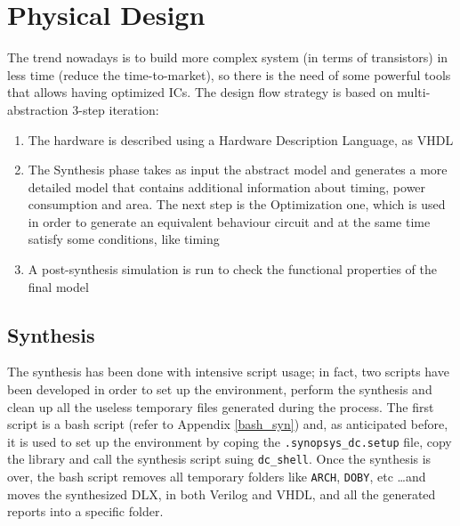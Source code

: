 \chapter{Physical Design}
The trend nowadays is to build more complex system (in terms of transistors) in less time (reduce the time-to-market), so there is the need of some powerful tools that allows having optimized ICs. The design flow strategy is based on multi-abstraction 3-step iteration:
\begin{enumerate}
    \item The hardware is described using a Hardware Description Language, as VHDL
    \item The Synthesis phase takes as input the abstract model and generates a more detailed model that contains additional information about timing, power consumption and area. The next step is the Optimization one, which is used in order to generate an equivalent behaviour circuit and at the same time satisfy some conditions, like timing
    \item A post-synthesis simulation is run to check the functional properties of the final model
\end{enumerate}
\section{Synthesis}
\label{sec:syn_opt}
The synthesis has been done with intensive script usage; in fact, two scripts have been developed in order to set up the environment, perform the synthesis and clean up all the useless temporary files generated during the process.\newline\newline
The first script is a bash script (refer to Appendix \ref{bash_syn}) and, as anticipated before, it is used to set up the environment by coping the \texttt{.synopsys\_dc.setup} file, copy the library and call the synthesis script suing \texttt{dc\_shell}.
Once the synthesis is over, the bash script removes all temporary folders like \texttt{ARCH}, \texttt{DOBY}, etc \dots and moves the synthesized DLX, in both Verilog and VHDL, and all the generated reports into a specific folder.\newline\newline

